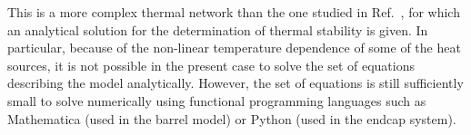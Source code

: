 This is a more complex thermal network than the one studied in Ref.~\cite{Beck:2010zzd}, for which an analytical solution for the determination of thermal stability is given. In particular, because of the non-linear temperature dependence of some of the heat sources, it is not possible in the present case to solve the set of equations describing the model analytically. However, the set of equations is still sufficiently small to solve numerically using functional programming languages such as Mathematica (used in the barrel model) or Python (used in the endcap system).
